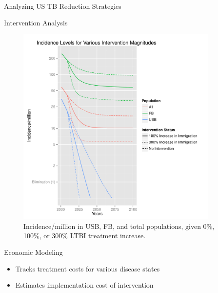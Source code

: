 \documentclass[final]{beamer}
\begin{document}
\begin{frame}
\begin{columns}
\begin{column}{.3\textwidth}
\begin{block}{Analyzing US TB Reduction Strategies}
\begin{block}{Intervention Analysis}
\begin{figure}[h]
              \begin{center}
                \includegraphics[height=10cm,width=\textwidth]{incLTBItrmtIncGrouped}
              \end{center}
              \caption{Incidence/million in USB, FB, and total populations,
                       given 0\%, 100\%, or 300\% LTBI treatment increase.}
              \label{fig:incLTBItrmt_incidence}
            \end{figure}
        \end{block}
      \end{block}
      \begin{block}{Economic Modeling}
        \begin{itemize}
          \item Tracks treatment costs for various disease states
          \item Estimates implementation cost of intervention
        \end{itemize}
        \begin{block}{}
          \vspace{-4em}
          \begin{column}{.66\textwidth}
            \begin{figure}[h]
              \begin{center}

\end{center}
\end{figure}
\end{column}
\end{block}
\end{block}
\end{column}
\end{columns}
\end{frame}
\end{document}
